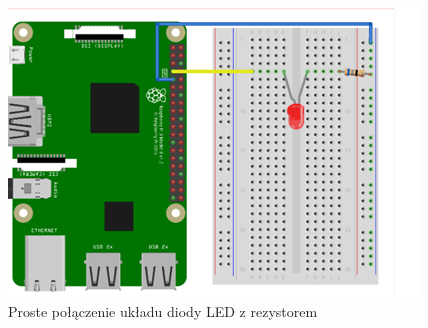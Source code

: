 \begin{figure}[htbp]
	\centering
	\includegraphics[width=0.7\linewidth]{"obrazy/diodapołączenie"}
	\caption{Proste połączenie układu diody LED z rezystorem}
	\label{fig:4}
\end{figure}
